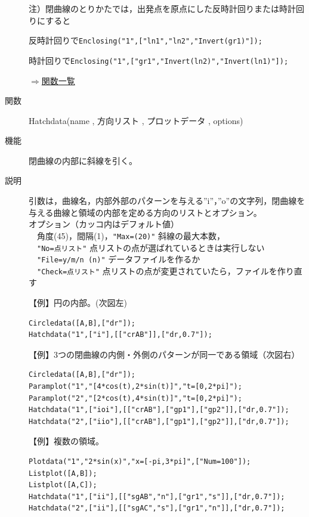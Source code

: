\documentclass[papersize,a4paper,10pt,uplatex]{jsarticle}
\begin{document}
\begin{description}
\vspace{\baselineskip}
注）閉曲線のとりかたでは，出発点を原点にした反時計回りまたは時計回りにすると

反時計回りで\verb|Enclosing("1",["ln1","ln2","Invert(gr1)"]);|

時計回りで\verb|Enclosing("1",["gr1","Invert(ln2)","Invert(ln1)"]);|

\begin{flushright}\hyperlink{functionlist}{$\Rightarrow$関数一覧}\end{flushright}

\vspace{\baselineskip}
\hypertarget{hatchdata}{}
\item[関数]Hatchdata(name , 方向リスト , プロットデータ , options)
\item[機能]閉曲線の内部に斜線を引く。
\item[説明]引数は，曲線名，内部外部のパターンを与える''i''，''o''の文字列，閉曲線を与える曲線と領域の内部を定める方向のリストとオプション。\\
オプション（カッコ内はデフォルト値）\\
　角度(45)，間隔(1)，\verb|"Max=(20)"| 斜線の最大本数，\\
　\verb|"No=点リスト"| 点リストの点が選ばれているときは実行しない\\
　\verb|"File=y/m/n (n)"| データファイルを作るか\\
　\verb|"Check=点リスト"| 点リストの点が変更されていたら，ファイルを作り直す
 
\vspace{\baselineskip}
【例】円の内部。(次図左)
\begin{verbatim}
Circledata([A,B],["dr"]);
Hatchdata("1",["i"],[["crAB"]],["dr,0.7"]);
\end{verbatim}

【例】3つの閉曲線の内側・外側のパターンが同一である領域（次図右）
\begin{verbatim}
Circledata([A,B],["dr"]);
Paramplot("1","[4*cos(t),2*sin(t)]","t=[0,2*pi]");
Paramplot("2","[2*cos(t),4*sin(t)]","t=[0,2*pi]");
Hatchdata("1",["ioi"],[["crAB"],["gp1"],["gp2"]],["dr,0.7"]);
Hatchdata("2",["iio"],[["crAB"],["gp1"],["gp2"]],["dr,0.7"]);
\end{verbatim}
\vspace{\baselineskip}
\hspace{5mm}  \hspace{5mm}  

【例】複数の領域。
\begin{verbatim}
Plotdata("1","2*sin(x)","x=[-pi,3*pi]",["Num=100"]);
Listplot([A,B]);
Listplot([A,C]);
Hatchdata("1",["ii"],[["sgAB","n"],["gr1","s"]],["dr,0.7"]);
Hatchdata("2",["ii"],[["sgAC","s"],["gr1","n"]],["dr,0.7"]);
\end{verbatim}
\begin{center}
\begin{center}  \end{center}
\end{center}


\end{description}
\end{document}
